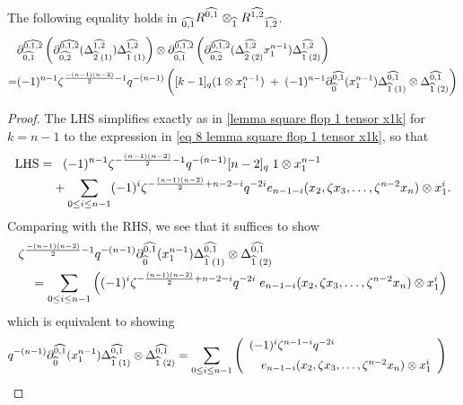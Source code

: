 \begin{lemma}\label{lemma square flop 1 tensor x1k for k=n-1}
The following equality holds in $\Bimod{\hh{0,1}}{}{R^{\hh{0,1}}}\otimes_{\hh{1}}\Bimod{}{\hh{1,2}}{R^{\hh{1,2}}}$.
    \begin{align*}
    &\ddm{0,1,2}{0,1}\left(\ddm{0,1,2}{0,2}(\Del{1,2}{2}{1})\Del{1,2}{1}{1}\right) \otimes \ddm{0,1,2}{0,1}\left(\ddm{0,1,2}{0,2}(\Del{1,2}{2}{2}x_1^{n-1})\Del{1,2}{1}{2} \right) \\
    =& (-1)^{n-1}\zeta^{\frac{-(n-1)(n-2)}{2}-1}q^{-(n-1)}\left([k-1]_q(1\otimes x_1^{n-1})
    \;+\; (-1)^{n-1}\ddm{0,1}{0}(x_1^{n-1})\Del{0,1}{1}{1} \otimes \Del{0,1}{1}{2} \right)
    \end{align*}
\end{lemma}
\begin{proof}
    The LHS simplifies exactly as in \cref{lemma square flop 1 tensor x1k} for $k=n-1$ to the expression in \cref{eq 8 lemma square flop 1 tensor x1k}, so that
    \begin{align}
    \text{LHS} =&\;\;\;\notag (-1)^{n-1}\zeta^{-\frac{(n-1)(n-2)}{2}-1}q^{-(n-1)}[n-2]_q\; 1\otimes x_1^{n-1}\\
    &+\sum_{0\leq i \leq n-1} (-1)^{i}\zeta^{-\frac{(n-1)(n-2)}{2}+n-2-i}
        q^{-2i} e_{n-1-i}(x_2, \zeta x_3, \ldots, \zeta^{n-2}x_{n})\otimes x_1^{i}.
    \end{align}
    Comparing with the RHS, we see that it suffices to show
    \begin{align}
        \notag &\zeta^{\frac{-(n-1)(n-2)}{2}-1}q^{-(n-1)}\ddm{0,1}{0}(x_1^{n-1})\Del{0,1}{1}{1} \otimes \Del{0,1}{1}{2} \\
        &\quad = \sum_{0\leq i \leq n-1} \left(
        (-1)^{i}\zeta^{-\frac{(n-1)(n-2)}{2}+n-2-i}
        q^{-2i}\; e_{n-1-i}(x_2, \zeta x_3, \ldots, \zeta^{n-2}x_{n})\otimes x_1^{i}\right)
    \end{align}
    which is equivalent to showing
    \begin{align}\label{eq 1 lemma square flop 1 tensor x1k for k=n-1}
       q^{-(n-1)}\ddm{0,1}{0}(x_1^{n-1})\Del{0,1}{1}{1} \otimes \Del{0,1}{1}{2} &= \sum_{0\leq i \leq n-1} \left(
        \begin{array}{l}(-1)^{i}\zeta^{n-1-i}
        q^{-2i}\vspace{5 pt}\\
        \quad e_{n-1-i}(x_2, \zeta x_3, \ldots, \zeta^{n-2}x_{n})\otimes x_1^{i}\end{array}\right)
    \end{align}

\end{proof}

